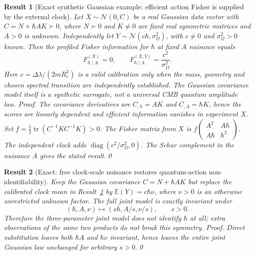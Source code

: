 \documentclass[aps,prd,onecolumn,notitlepage,groupedaddress,11pt]{revtex4-2}
\newtheorem{result}{Result}
\begin{document}
\begin{result}[\textsf{Exact synthetic Gaussian example}: efficient action Fisher is supplied by the external clock]\label{new:252}
Let $X\sim\mathcal N(0,C)$ be a real Gaussian data vector with $C=N+\hbar A K\succ0$, where $N\succ0$ and $K\ne0$ are fixed real symmetric matrices and $A>0$ is unknown. Independently let $Y\sim\mathcal N(c\hbar,\sigma_\Omega^2)$, with $c\ne0$ and $\sigma_\Omega^2>0$ \emph{known}. Then the profiled Fisher information for $\hbar$ at fixed $A$ nuisance equals
\begin{equation}\label{eq:twisted252}
 F_{\hbar\mid A}^{(X)}=0,\qquad F_{\hbar\mid A}^{(X,Y)}=\frac{c^2}{\sigma_\Omega^2}.
\end{equation}
Here $c=\Delta\lambda/(2mR_c^2)$ is a valid calibration only when the mass, geometry and chosen spectral transition are independently established. The Gaussian covariance model itself is a \emph{synthetic surrogate}, not a universal CMB quantum amplitude law.
\textit{Proof.} The covariance derivatives are $C_{,\hbar}=AK$ and $C_{,A}=\hbar K$, hence the scores are linearly dependent and efficient information vanishes in experiment $X$. Set $f=\tfrac12\operatorname{tr}(C^{-1}KC^{-1}K)>0$. The Fisher matrix from $X$ is $f\left(\begin{smallmatrix}A^2&A\hbar\\A\hbar&\hbar^2\end{smallmatrix}\right)$. The independent clock adds $\operatorname{diag}(c^2/\sigma_\Omega^2,0)$. The Schur complement in the nuisance $A$ gives the stated result.\qed
\end{result}

\begin{result}[\textsf{Exact}: free clock-scale nuisance restores quantum-action non-identifiability]\label{new:253}
Keep the Gaussian covariance $C=N+\hbar A K$ but replace the calibrated clock mean in Result~\ref{new:252} by $\mathbb E(Y)=c\hbar\nu$, where $\nu>0$ is an otherwise unrestricted unknown factor. The full joint model is exactly invariant under
\begin{equation}\label{eq:twisted253}
 (\hbar,A,\nu)\longmapsto(s\hbar,A/s,\nu/s),\qquad s>0.
\end{equation}
Therefore the three-parameter joint model does not identify $\hbar$ at all; extra observations of the same two products do not break this symmetry.
\textit{Proof.} Direct substitution leaves both $\hbar A$ and $\hbar\nu$ invariant, hence leaves the entire joint Gaussian law unchanged for arbitrary $s>0$.\qed
\end{result}
\end{document}
